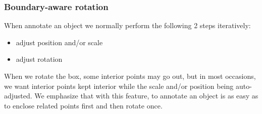 \documentclass[letterpaper, 10 pt, conference]{ieeeconf}  %
\begin{document}
\subsubsection{Boundary-aware rotation}

When annotate an object we normally perform the following 2 steps iteratively:
\begin{itemize}
	\item adjust position and/or scale
	\item adjust rotation	
\end{itemize}

When we rotate the box, some interior points may go out, but in most occasions, we want interior points kept interior while the scale and/or position being auto-adjusted. We emphasize that with this feature, to annotate an object is as easy as to enclose related points first and then rotate once.
\end{document}
